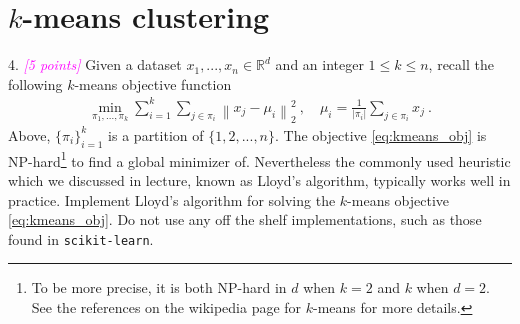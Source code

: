 \documentclass{article}
\newcommand{\field}[1]{\mathbb{#1}}
\newcommand{\1}{\mathbf{1}}
\newcommand{\R}{\field{R}} %
\newcommand{\norm}[1]{\left\|#1\right\|}
\newcommand{\grade}[1]{\small\textcolor{magenta}{\emph{[#1 points]}} \normalsize}
\begin{document}
\section{$k$-means clustering}

4. \grade{5} Given a dataset $x_1,..., x_n \in \R^{d}$ and an integer $1 \leq k \leq n$, recall the following $k$-means objective function
\begin{align}
    \min_{\pi_1, ..., \pi_k} \sum_{i=1}^{k} \sum_{j \in \pi_i} \norm{ x_j - \mu_{i} }^2_2 \ , \quad \mu_i = \frac{1}{|\pi_i|} \sum_{j \in \pi_i} x_j \ . \label{eq:kmeans_obj}
\end{align}
Above, $\{\pi_i\}_{i=1}^{k}$ is a partition of $\{1, 2, ..., n\}$. The objective \eqref{eq:kmeans_obj} is NP-hard\footnote{
To be more precise, it is both NP-hard in $d$ when $k=2$ and $k$ when $d=2$.
See the references on the wikipedia page for $k$-means for more details.
} to find a global minimizer of. Nevertheless the commonly used heuristic which we discussed in lecture, known as Lloyd's algorithm, typically works well in practice.
Implement Lloyd's algorithm for solving the $k$-means objective \eqref{eq:kmeans_obj}.
Do not use any off the shelf implementations, such as those found in \texttt{scikit-learn}.
\end{document}
